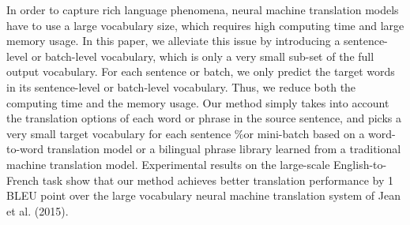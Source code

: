 In order to capture rich language phenomena, neural machine translation models have to use a large vocabulary size, which requires high computing time and large memory usage. In this paper, we alleviate this issue by introducing a sentence-level or batch-level vocabulary, which is only a very small sub-set of the full output vocabulary. For each sentence or batch, we only predict the target words in its sentence-level or batch-level vocabulary. Thus, we reduce both the computing time and the memory usage. Our method simply takes into account the translation options of each word or phrase in the source sentence, and picks a very small target vocabulary for each sentence \%or mini-batch based on a word-to-word translation model or a bilingual phrase library learned from a traditional machine translation model. Experimental results on the large-scale English-to-French task show that our method achieves better translation performance by 1 BLEU point over the large vocabulary neural machine translation system of Jean et al. (2015).
